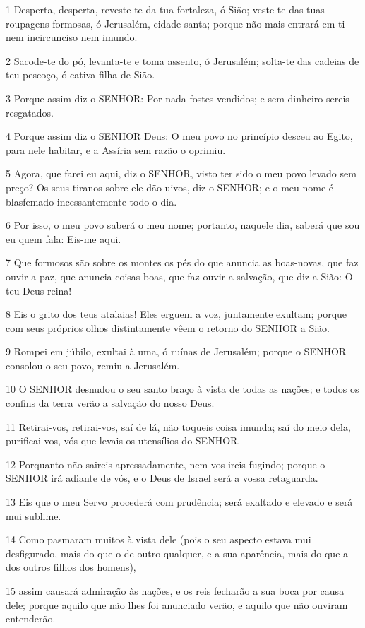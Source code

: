\par 1 Desperta, desperta, reveste-te da tua fortaleza, ó Sião; veste-te das tuas roupagens formosas, ó Jerusalém, cidade santa; porque não mais entrará em ti nem incircunciso nem imundo.
\par 2 Sacode-te do pó, levanta-te e toma assento, ó Jerusalém; solta-te das cadeias de teu pescoço, ó cativa filha de Sião.
\par 3 Porque assim diz o SENHOR: Por nada fostes vendidos; e sem dinheiro sereis resgatados.
\par 4 Porque assim diz o SENHOR Deus: O meu povo no princípio desceu ao Egito, para nele habitar, e a Assíria sem razão o oprimiu.
\par 5 Agora, que farei eu aqui, diz o SENHOR, visto ter sido o meu povo levado sem preço? Os seus tiranos sobre ele dão uivos, diz o SENHOR; e o meu nome é blasfemado incessantemente todo o dia.
\par 6 Por isso, o meu povo saberá o meu nome; portanto, naquele dia, saberá que sou eu quem fala: Eis-me aqui.
\par 7 Que formosos são sobre os montes os pés do que anuncia as boas-novas, que faz ouvir a paz, que anuncia coisas boas, que faz ouvir a salvação, que diz a Sião: O teu Deus reina!
\par 8 Eis o grito dos teus atalaias! Eles erguem a voz, juntamente exultam; porque com seus próprios olhos distintamente vêem o retorno do SENHOR a Sião.
\par 9 Rompei em júbilo, exultai à uma, ó ruínas de Jerusalém; porque o SENHOR consolou o seu povo, remiu a Jerusalém.
\par 10 O SENHOR desnudou o seu santo braço à vista de todas as nações; e todos os confins da terra verão a salvação do nosso Deus.
\par 11 Retirai-vos, retirai-vos, saí de lá, não toqueis coisa imunda; saí do meio dela, purificai-vos, vós que levais os utensílios do SENHOR.
\par 12 Porquanto não saireis apressadamente, nem vos ireis fugindo; porque o SENHOR irá adiante de vós, e o Deus de Israel será a vossa retaguarda.
\par 13 Eis que o meu Servo procederá com prudência; será exaltado e elevado e será mui sublime.
\par 14 Como pasmaram muitos à vista dele (pois o seu aspecto estava mui desfigurado, mais do que o de outro qualquer, e a sua aparência, mais do que a dos outros filhos dos homens),
\par 15 assim causará admiração às nações, e os reis fecharão a sua boca por causa dele; porque aquilo que não lhes foi anunciado verão, e aquilo que não ouviram entenderão.

